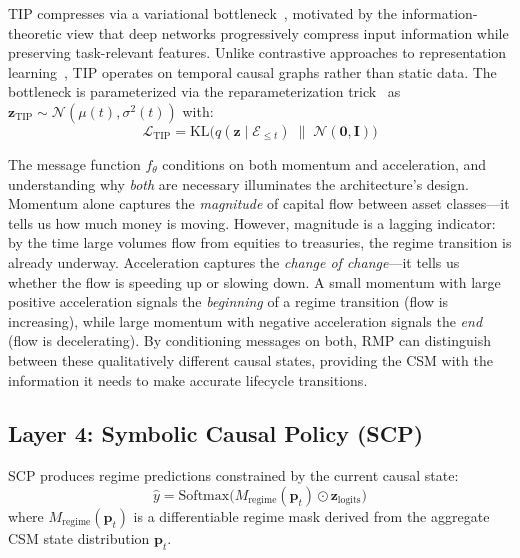 \documentclass[11pt]{article}
\newcommand{\KL}{\mathrm{KL}}
\newcommand{\Softmax}{\mathrm{Softmax}}
\newcommand{\TIP}{\mathrm{TIP}}
\begin{document}
TIP compresses via a variational bottleneck~\citep{shwartzziv2017opening}, motivated by the information-theoretic view that deep networks progressively compress input information while preserving task-relevant features. Unlike contrastive approaches to representation learning~\citep{oord2018cpc,chen2020simclr}, TIP operates on temporal causal graphs rather than static data. The bottleneck is parameterized via the reparameterization trick~\citep{kingma2014vae} as $\mathbf{z}_{\TIP} \sim \mathcal{N}(\mu(t), \sigma^2(t))$ with:
\begin{equation}
    \mathcal{L}_{\TIP} = \KL\bigl(q(\mathbf{z} \mid \mathcal{E}_{\leq t}) \;\|\; \mathcal{N}(\mathbf{0}, \mathbf{I})\bigr)
\end{equation}

The message function $f_\theta$ conditions on both momentum and acceleration, and understanding why \emph{both} are necessary illuminates the architecture's design. Momentum alone captures the \emph{magnitude} of capital flow between asset classes---it tells us how much money is moving. However, magnitude is a lagging indicator: by the time large volumes flow from equities to treasuries, the regime transition is already underway. Acceleration captures the \emph{change of change}---it tells us whether the flow is speeding up or slowing down. A small momentum with large positive acceleration signals the \emph{beginning} of a regime transition (flow is increasing), while large momentum with negative acceleration signals the \emph{end} (flow is decelerating). By conditioning messages on both, RMP can distinguish between these qualitatively different causal states, providing the CSM with the information it needs to make accurate lifecycle transitions.

\subsection{Layer 4: Symbolic Causal Policy (SCP)}

SCP produces regime predictions constrained by the current causal state:
\begin{equation}
    \hat{y} = \Softmax\bigl(M_{\text{regime}}(\mathbf{p}_t) \odot \mathbf{z}_{\text{logits}}\bigr)
\end{equation}
where $M_{\text{regime}}(\mathbf{p}_t)$ is a differentiable regime mask derived from the aggregate CSM state distribution $\mathbf{p}_t$.
\end{document}
